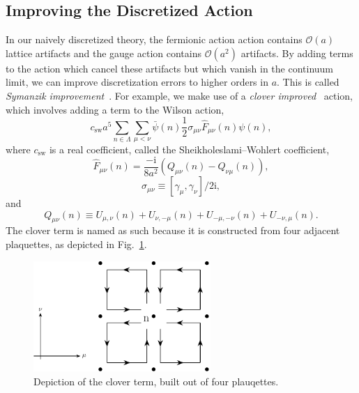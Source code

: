 \subsection{Improving the Discretized Action}\label{sec:improved_action}
In our naively discretized theory, the fermionic action action contains $\mathcal O(a)$ lattice artifacts and the gauge action contains $\mathcal O(a^2)$ artifacts. By adding terms to the action which cancel these artifacts but which vanish in the continuum limit, we can improve discretization errors to higher orders in $a$. This is called \emph{Symanzik improvement}~\cite{Symanzik:1983dc}. For example, we make use of a \emph{clover improved}~\cite{Sheikholeslami:1985ij} action, which involves adding a term to the Wilson action,
\begin{equation}
    c_{\mathrm{sw}} a^{5} \sum_{n \in \Lambda} \sum_{\mu<\nu} \bar{\psi}(n) \frac{1}{2} \sigma_{\mu \nu} \widehat{F}_{\mu \nu}(n) \psi(n),
\end{equation}
where $c_{\mathrm{sw}}$ is a real coefficient, called the Sheikholeslami–Wohlert coefficient,
\begin{equation}
    \widehat{F}_{\mu \nu}(n)=\frac{-\mathrm{i}}{8 a^{2}}\left(Q_{\mu \nu}(n)-Q_{\nu \mu}(n)\right),
\end{equation}
\begin{equation}
    \sigma_{\mu \nu} \equiv\left[\gamma_{\mu}, \gamma_{\nu}\right] / 2 \mathrm{i},
\end{equation}
and
\begin{equation}
    Q_{\mu \nu}(n) \equiv U_{\mu, \nu}(n)+U_{\nu,-\mu}(n)+U_{-\mu,-\nu}(n)+U_{-\nu, \mu}(n).
\end{equation}
The clover term is named as such because it is constructed from four adjacent plaquettes, as depicted in Fig.~\ref{fig:clover}.
\begin{figure}
    \centering
    \hspace*{-1in}\includegraphics[width=0.6\textwidth]{figures/clover.pdf}
    \caption{Depiction of the clover term, built out of four plauqettes.}
    \label{fig:clover}
\end{figure}

